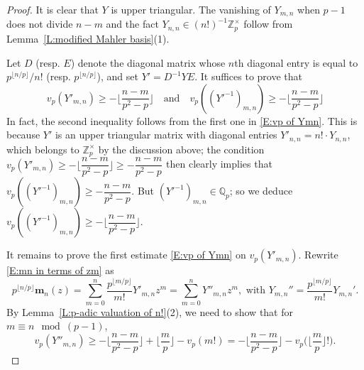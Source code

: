 \documentclass[12pt]{amsart}
\theoremstyle{definition}
\numberwithin{equation}{subsection}
\def\QQ{\mathbb{Q}}
\def\ZZ{\mathbb{Z}}
\def\bfm{\mathbf{m}}
\begin{document}
\begin{proof}
It is clear that $Y$ is upper triangular. The vanishing of $Y_{m,n}$ when $p-1$ does not divide $n-m$ and the fact $Y_{n,n} \in (n!)^{-1}\ZZ_p^\times$ follow from Lemma~\ref{L:modified Mahler basis}(1).

Let $D$ (resp. $E$) denote the diagonal matrix whose $n$th diagonal entry is equal to $p^{\lfloor n/p\rfloor}/n!$ (resp. $p^{\lfloor n/p\rfloor}$), and set $Y'= D^{-1}YE$. It suffices to prove that 
\begin{equation}
\label{E:vp of Ymn}v_p(Y'_{m,n}) \geq -\Big\lfloor \dfrac{n-m}{p^2-p}\Big\rfloor\quad \textrm{and}\quad v_p((Y'^{-1})_{m,n}) \geq - \Big\lfloor \dfrac{n-m}{p^2-p}\Big\rfloor
\end{equation}
In fact, the second inequality follows from the first one in \eqref{E:vp of Ymn}. This is because $Y'$ is an upper triangular matrix with diagonal entries $Y'_{n,n} = n!\cdot  Y_{n,n}$, which belongs to $\ZZ_p^\times$ by the discussion above; the condition $v_p(Y'_{m,n}) \geq -\Big\lfloor \dfrac{n-m}{p^2-p}\Big\rfloor \geq - \dfrac{n-m}{p^2-p}$  then clearly implies that $v_p((Y'^{-1})_{m,n}) \geq - \dfrac {n-m}{p^2-p}$. But $(Y'^{-1})_{m,n} \in \QQ_p$; so we deduce $v_p((Y'^{-1})_{m,n} )\geq - \Big\lfloor \dfrac {n-m}{p^2-p}\Big\rfloor$.

It remains to prove the first estimate \eqref{E:vp of Ymn} on $v_p(Y'_{m,n})$. Rewrite \eqref{E:mn in terms of zm} as 
\begin{equation}
\label{E:definition of Y''_m,n}
p^{\lfloor n/p\rfloor}
\bfm_n(z) =  \sum_{m =0}^n \frac{p^{\lfloor m/p\rfloor}}{m!}Y'_{m,n} z^m= \sum_{m=0}^n Y''_{m,n}z^m,\text{~with~}Y_{m,n}''=\frac{p^{\lfloor m/p\rfloor}}{m!}Y_{m,n}'.
\end{equation}
By Lemma~\ref{L:p-adic valuation of n!}(2), we need to show that for $m\equiv n \mod (p-1)$, \begin{equation}
\label{E:estimate of Y prime}
v_p(Y''_{m,n}) \geq -\Big\lfloor \dfrac{n-m}{p^2-p} \Big\rfloor +\Big\lfloor \frac mp \Big\rfloor- v_p(  m!) =  -\Big\lfloor \dfrac{n-m}{p^2-p} \Big\rfloor - v_p\Big( \Big\lfloor \frac mp \Big\rfloor !\Big).\end{equation}


\end{proof}
\end{document}
